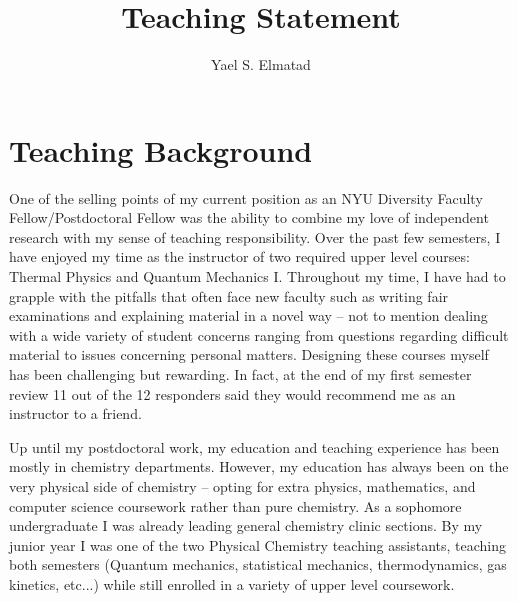 \documentclass[11pt]{article}
\title{{Teaching Statement}}
\author{Yael S. Elmatad}
\date{}                                           %
\begin{document}
\maketitle
%

\section{Teaching Background}

One of the selling points of my current position as an NYU Diversity Faculty Fellow/Postdoctoral Fellow was the ability to combine my love of independent research with my sense of teaching responsibility.  Over the past few semesters, I have enjoyed my time as the instructor of two required upper level courses: Thermal Physics and Quantum Mechanics I.  Throughout my time, I have had to grapple with the pitfalls that often face new faculty such as writing fair examinations and explaining material in a novel way -- not to mention dealing with a wide variety of student concerns ranging from questions regarding difficult material to issues concerning personal matters.  Designing these courses myself has been challenging but rewarding.  In fact, at the end of my first semester review 11 out of the 12 responders said they would recommend me as an instructor to a friend. 

Up until my postdoctoral work, my education and teaching experience has been mostly in chemistry departments.  However, my education has always been on the very physical side of chemistry -- opting for extra physics, mathematics, and computer science coursework rather than pure chemistry.  As a sophomore undergraduate I was already leading general chemistry clinic sections.  By my junior year I was one of the two Physical Chemistry teaching assistants, teaching both semesters (Quantum mechanics, statistical mechanics, thermodynamics, gas kinetics, etc...) while still enrolled in a variety of upper level coursework.
\end{document}
